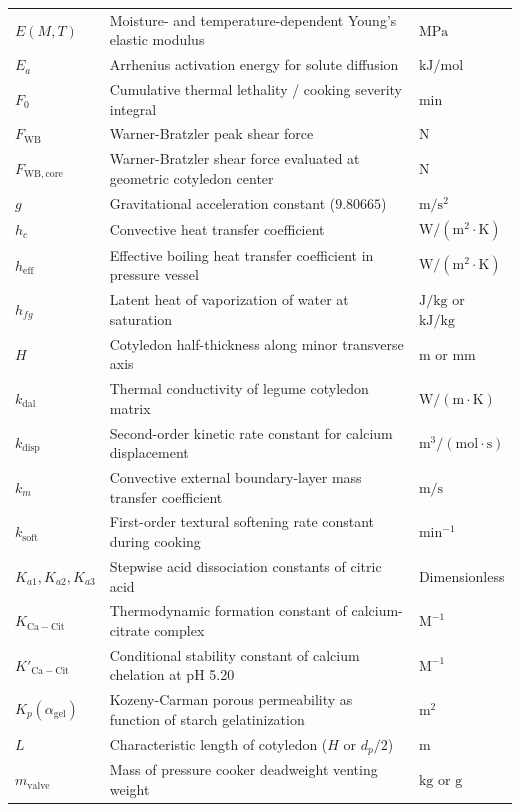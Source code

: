 \documentclass[10pt,a4paper]{article}
\begin{document}
\begin{longtable}{p{2.5cm}p{10.2cm}p{3.0cm}}
$E(M, T)$ & Moisture- and temperature-dependent Young's elastic modulus & $\mathrm{MPa}$ \\
$E_a$ & Arrhenius activation energy for solute diffusion & $\mathrm{kJ/mol}$ \\
$F_0$ & Cumulative thermal lethality / cooking severity integral & $\mathrm{min}$ \\
$F_{\mathrm{WB}}$ & Warner-Bratzler peak shear force & $\mathrm{N}$ \\
$F_{\mathrm{WB,core}}$ & Warner-Bratzler shear force evaluated at geometric cotyledon center & $\mathrm{N}$ \\
$g$ & Gravitational acceleration constant ($9.80665$) & $\mathrm{m/s^2}$ \\
$h_c$ & Convective heat transfer coefficient & $\mathrm{W/(m^2 \cdot K)}$ \\
$h_{\mathrm{eff}}$ & Effective boiling heat transfer coefficient in pressure vessel & $\mathrm{W/(m^2 \cdot K)}$ \\
$h_{fg}$ & Latent heat of vaporization of water at saturation & $\mathrm{J/kg}$ or $\mathrm{kJ/kg}$ \\
$H$ & Cotyledon half-thickness along minor transverse axis & $\mathrm{m}$ or $\mathrm{mm}$ \\
$k_{\mathrm{dal}}$ & Thermal conductivity of legume cotyledon matrix & $\mathrm{W/(m \cdot K)}$ \\
$k_{\mathrm{disp}}$ & Second-order kinetic rate constant for calcium displacement & $\mathrm{m^3/(mol \cdot s)}$ \\
$k_m$ & Convective external boundary-layer mass transfer coefficient & $\mathrm{m/s}$ \\
$k_{\mathrm{soft}}$ & First-order textural softening rate constant during cooking & $\mathrm{min^{-1}}$ \\
$K_{a1}, K_{a2}, K_{a3}$ & Stepwise acid dissociation constants of citric acid & Dimensionless \\
$K_{\mathrm{Ca-Cit}}$ & Thermodynamic formation constant of calcium-citrate complex & $\mathrm{M^{-1}}$ \\
$K'_{\mathrm{Ca-Cit}}$ & Conditional stability constant of calcium chelation at pH 5.20 & $\mathrm{M^{-1}}$ \\
$K_p(\alpha_{\mathrm{gel}})$ & Kozeny-Carman porous permeability as function of starch gelatinization & $\mathrm{m^2}$ \\
$L$ & Characteristic length of cotyledon ($H$ or $d_p/2$) & $\mathrm{m}$ \\
$m_{\mathrm{valve}}$ & Mass of pressure cooker deadweight venting weight & $\mathrm{kg}$ or $\mathrm{g}$ \\

\end{longtable}
\end{document}
